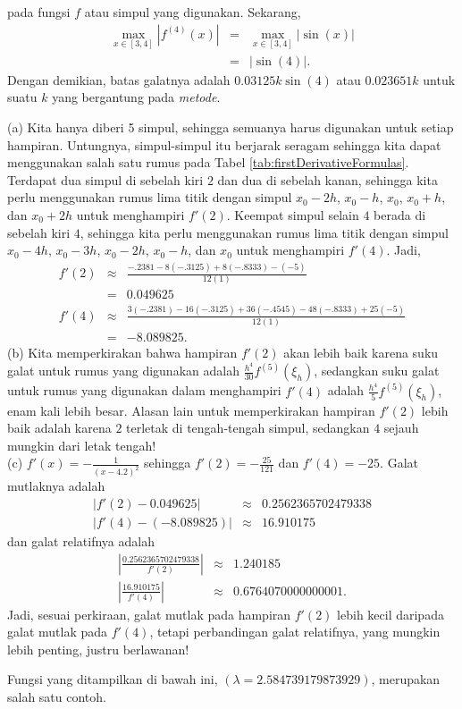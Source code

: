 \begin{description}
pada fungsi $f$ atau simpul yang digunakan. Sekarang,
\begin{eqnarray*}
\max_{x\in[3,4]}\left|f^{(4)}(x)\right| & = & \max_{x\in[3,4]}\left|\sin(x)\right|\\
 & = & \left|\sin(4)\right|.
\end{eqnarray*}
Dengan demikian, batas galatnya adalah $0.03125k\sin(4)$ atau $0.023651k$
untuk suatu $k$ yang bergantung pada \textit{metode}.
\item [{\ref{exc:calculusErrors-18}:}] (a) Kita hanya diberi 5 simpul,
sehingga semuanya harus digunakan untuk setiap hampiran. Untungnya,
simpul-simpul itu berjarak seragam sehingga kita dapat menggunakan
salah satu rumus pada Tabel \ref{tab:firstDerivativeFormulas}. Terdapat
dua simpul di sebelah kiri $2$ dan dua di sebelah kanan, sehingga
kita perlu menggunakan rumus lima titik dengan simpul $x_{0}-2h$,
$x_{0}-h$, $x_{0}$, $x_{0}+h$, dan $x_{0}+2h$ untuk menghampiri
$f'(2)$. Keempat simpul selain $4$ berada di sebelah kiri $4$,
sehingga kita perlu menggunakan rumus lima titik dengan simpul $x_{0}-4h$,
$x_{0}-3h$, $x_{0}-2h$, $x_{0}-h$, dan $x_{0}$ untuk menghampiri
$f'(4)$. Jadi,
\begin{eqnarray*}
f'(2) & \approx & \frac{-.2381-8(-.3125)+8(-.8333)-(-5)}{12(1)}\\
 & = & 0.049625\\
f'(4) & \approx & \frac{3(-.2381)-16(-.3125)+36(-.4545)-48(-.8333)+25(-5)}{12(1)}\\
 & = & -8.089825.
\end{eqnarray*}
(b) Kita memperkirakan bahwa hampiran $f'(2)$ akan lebih baik karena
suku galat untuk rumus yang digunakan adalah $\frac{h^{4}}{30}f^{(5)}(\xi_{h})$,
sedangkan suku galat untuk rumus yang digunakan dalam menghampiri
$f'(4)$ adalah $\frac{h^{4}}{5}f^{(5)}(\xi_{h})$, enam kali lebih
besar. Alasan lain untuk memperkirakan hampiran $f'(2)$ lebih baik
adalah karena $2$ terletak di tengah-tengah simpul, sedangkan $4$
sejauh mungkin dari letak tengah!\\
(c) $f'(x)=-\frac{1}{(x-4.2)^{2}}$ sehingga $f'(2)=-\frac{25}{121}$
dan $f'(4)=-25$. Galat mutlaknya adalah
\begin{eqnarray*}
|f'(2)-0.049625| & \approx & 0.2562365702479338\\
|f'(4)-(-8.089825)| & \approx & 16.910175
\end{eqnarray*}
dan galat relatifnya adalah
\begin{eqnarray*}
\left|\frac{0.2562365702479338}{f'(2)}\right| & \approx & 1.240185\\
\left|\frac{16.910175}{f'(4)}\right| & \approx & 0.6764070000000001.
\end{eqnarray*}
Jadi, sesuai perkiraan, galat mutlak pada hampiran $f'(2)$ lebih
kecil daripada galat mutlak pada $f'(4)$, tetapi perbandingan galat
relatifnya, yang mungkin lebih penting, justru berlawanan!
\item [{\ref{exc:calculusErrors-15}:}] Fungsi yang ditampilkan di bawah
ini, $(\lambda=2.584739179873929)$, merupakan salah satu contoh.


\end{description}
